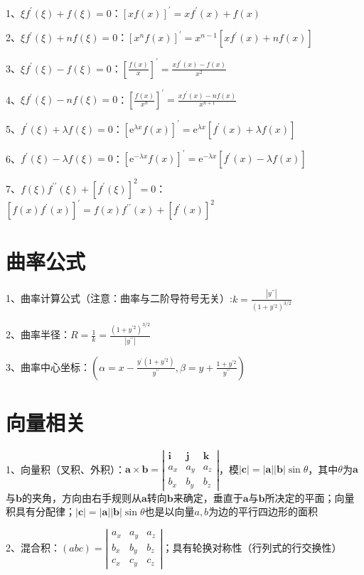 1、$\xi f^{\prime}(\xi)+f(\xi)=0$：$[x f(x)]^{\prime}=x f^{\prime}(x)+f(x)$

2、$\xi f^{\prime}(\xi)+n f(\xi)=0$：$\left[x^{n} f(x)\right]^{\prime}=x^{n-1}\left[x f^{\prime}(x)+n f(x)\right]$

3、$\xi f^{\prime}(\xi)-f(\xi)=0$：$\left[\frac{f(x)}{x}\right]^{\prime}=\frac{x f^{\prime}(x)-f(x)}{x^{2}}$

4、$\xi f^{\prime}(\xi)-n f(\xi)=0$：$\left[\frac{f(x)}{x^{n}}\right]^{\prime}=\frac{x f^{\prime}(x)-n f(x)}{x^{n+1}}$

5、$f^{\prime}(\xi)+\lambda f(\xi)=0$：$\left[\mathrm{e}^{\lambda x} f(x)\right]^{\prime}=\mathrm{e}^{\lambda x}\left[f^{\prime}(x)+\lambda f(x)\right]$

6、$f^{\prime}(\xi)-\lambda f(\xi)=0$：$\left[\mathrm{e}^{-\lambda x} f(x)\right]^{\prime}=\mathrm{e}^{-\lambda x}\left[f^{\prime}(x)-\lambda f(x)\right]$

7、$f(\xi) f^{\prime \prime}(\xi)+\left[f^{\prime}(\xi)\right]^{2}=0$：$\left[f(x) f^{\prime}(x)\right]^{\prime}=f(x) f^{\prime \prime}(x)+\left[f^{\prime}(x)\right]^{2}$

\section{曲率公式}

1、曲率计算公式（注意：曲率与二阶导符号无关）:$k=\frac{\left|y^{\prime \prime}\right|}{\left(1+y^{\prime 2}\right)^{3 / 2}}$

2、曲率半径：$R=\frac{1}{k}=\frac{\left(1+y^{\prime 2}\right)^{3 / 2}}{\left|y^{\prime \prime}\right|}$

3、曲率中心坐标：$(\alpha=x-\frac{y^{\prime}\left(1+y^{\prime 2}\right)}{y^{\prime \prime}}, \beta=y+\frac{1+y^{\prime 2}}{y^{\prime \prime}})$

\section{向量相关}

1、向量积（叉积、外积）：$\boldsymbol{a} \times \boldsymbol{b}=\left|\begin{array}{ccc}\boldsymbol{i} & \boldsymbol{j} & \boldsymbol{k} \\a_{x} & a_{y} & a_{z} \\b_{x} & b_{y} & b_{z}\end{array}\right|$，模$|\boldsymbol{c}|=|\boldsymbol{a}||\boldsymbol{b}| \sin \theta$，其中$\theta$为$\boldsymbol{a}$与$\boldsymbol{b}$的夹角，方向由右手规则从$\boldsymbol{a}$转向$\boldsymbol{b}$来确定，垂直于$\boldsymbol{a}$与$\boldsymbol{b}$所决定的平面；向量积具有分配律；$|\boldsymbol{c}|=|\boldsymbol{a}||\boldsymbol{b}| \sin \theta$也是以向量$a,b$为边的平行四边形的面积

2、混合积：$(a b c)=\left|\begin{array}{lll}a_{x} & a_{y} & a_{z} \\b_{x} & b_{y} & b_{z} \\c_{x} & c_{y} & c_{z}\end{array}\right|$；具有轮换对称性（行列式的行交换性）

